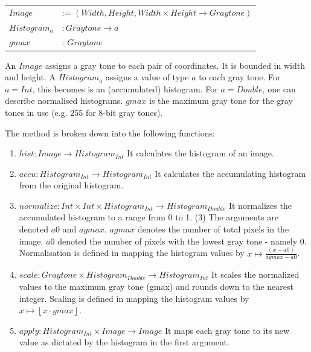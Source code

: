     \begin{table}[h!]
    \label{table:hbaldefs}
    \centering
    \begin{tabular}{ll}
      $Image$ & := $(Width,Height,Width \times Height \rightarrow Graytone)$ \\
      $Histogram_a$ & $: Graytone \rightarrow a$ \\
      $gmax$ & : $Graytone$ \\
    \end{tabular}
    \end{table}
    
    An $Image$ assigns a gray tone to each pair of coordinates. It is bounded in width and height.
    A $Histogram_a$ assigns a value of type $a$ to each gray tone. For $a = Int$,
    this becomes is an (accumulated) histogram. For $a = Double$, one can
    describe normalised histograms.
    $gmax$ is the maximum gray tone for the gray tones in use (e.g. 255 for 8-bit gray tones).
    
    The method is broken down into the following functions:
      
    \begin{enumerate}
      \item $hist: Image \rightarrow Histogram_{Int}$ \newline
        It calculates the histogram of an image.
      \item $accu: Histogram_{Int} \rightarrow Histogram_{Int}$ \newline
        It calculates the accumulating histogram from the original histogram.
      \item $normalize: Int \times Int \times Histogram_{Int} \rightarrow Histogram_{Double}$  \newline
        It normalizes the accumulated histogram
        to a range from 0 to 1. (3)
        The arguments are denoted $a0$ and $agmax$.
        $agmax$ denotes the number of total pixels in the image.
        $a0$ denoted the number of pixels with the lowest gray tone - namely 0.
        Normalisation is defined in mapping the histogram values by $x \mapsto \frac{(x - a0)}{agmax - a0}$.
      \item $scale: Graytone \times Histogram_{Double} \rightarrow Histogram_{Int}$  \newline
        It scales the normalized values to the maximum gray tone (gmax) and rounds down to the nearest integer.
        Scaling is defined in mapping the histogram values by $x \mapsto \left \lfloor{x \cdot gmax}\right \rfloor $.
      \item $apply: Histogram_{Int} \times Image \rightarrow Image$  \newline
        It maps each gray tone to its new value as dictated by the histogram in the first argument.
    \end{enumerate}
      
